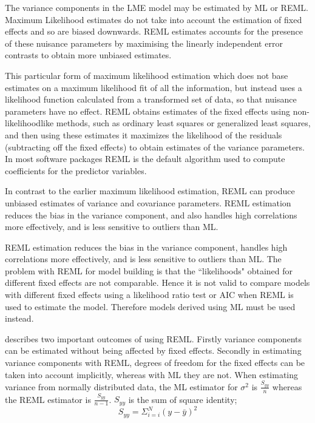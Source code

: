 \documentclass[12pt, a4paper]{report}
\theoremstyle{plain}
\theoremstyle{definition}
\theoremstyle{remark}
\begin{document}
The variance components in the LME model may be estimated by ML or REML. Maximum Likelihood estimates do not take into account the estimation of fixed effects and so
		are biased downwards. REML estimates accounts for the presence of these nuisance parameters by maximising the linearly independent error contrasts to obtain more unbiased estimates.
		
		This particular form of maximum likelihood estimation which does not base estimates on a maximum likelihood fit of all the information, but instead uses a likelihood function calculated from a transformed set of data, so that nuisance parameters have no effect. REML obtains estimates of the fixed effects using non-likelihoodlike methods, such as ordinary least squares or generalized least squares, and then using these estimates it
	maximizes the likelihood of the residuals (subtracting off the
	fixed effects) to obtain estimates of the variance parameters. In
	most software packages REML is the default algorithm used to
	compute coefficients for the predictor variables. 
	
	
			In contrast to the earlier maximum likelihood estimation, REML can produce unbiased estimates of variance and covariance parameters. REML estimation
			reduces the bias in the variance component, and also handles high
			correlations more effectively, and is less sensitive to outliers
			than ML.
			
		REML estimation reduces the bias in the variance component, handles high correlations
		more effectively, and is less sensitive to outliers than ML.  The problem with REML for model building is that the ``likelihoods" obtained for different fixed effects are not comparable. Hence it is not valid to compare models
		with different fixed effects using a likelihood ratio test or AIC when REML is used to estimate the model. Therefore models derived using ML must be used instead.
		
		
		
	
	
	\citet{McCullSearle} describes two important outcomes of using
	REML. Firstly variance components can be estimated without being
	affected by fixed effects. Secondly in estimating variance
	components with REML, degrees of freedom for the fixed effects can
	be taken into account implicitly, whereas with ML they are not.
	When estimating variance from normally distributed data, the ML
	estimator for $\sigma^{2}$ is $\frac{S_{yy}}{n}$ whereas the REML
	estimator is $\frac{S_{yy}}{n-1}$. $S_{yy}$ is the sum of square
	identity;
	\begin{equation}
	S_{yy} = \Sigma_{i=i}^{N} (y-\bar{y})^{2}
	\end{equation}
	
\end{document}
